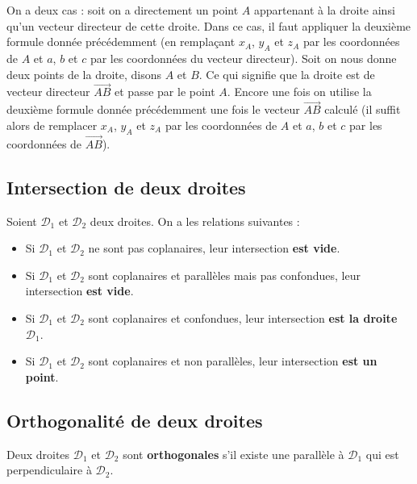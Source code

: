 	\begin{tip}
		On a deux cas : soit on a directement un point $A$ appartenant à la droite ainsi qu'un vecteur directeur de cette droite. Dans ce cas, il faut appliquer la deuxième formule donnée précédemment (en remplaçant $x_A$, $y_A$ et $z_A$ par les coordonnées de $A$ et $a$, $b$ et $c$ par les coordonnées du vecteur directeur).
		\newpar
		Soit on nous donne deux points de la droite, disons $A$ et $B$. Ce qui signifie que la droite est de vecteur directeur $\overrightarrow{AB}$ et passe par le point $A$. Encore une fois on utilise la deuxième formule donnée précédemment une fois le vecteur $\overrightarrow{AB}$ calculé (il suffit alors de remplacer $x_A$, $y_A$ et $z_A$ par les coordonnées de $A$ et $a$, $b$ et $c$ par les coordonnées de $\overrightarrow{AB}$).
	\end{tip}

	\subsection{Intersection de deux droites}

	\begin{formula}
		Soient $\mathcal{D}_1$ et $\mathcal{D}_2$ deux droites. On a les relations suivantes :
		\begin{itemize}
			\item Si $\mathcal{D}_1$ et $\mathcal{D}_2$ ne sont pas coplanaires, leur intersection \textbf{est vide}.
			\item Si $\mathcal{D}_1$ et $\mathcal{D}_2$ sont coplanaires et parallèles mais pas confondues, leur intersection \textbf{est vide}.
			\item Si $\mathcal{D}_1$ et $\mathcal{D}_2$ sont coplanaires et confondues, leur intersection \textbf{est la droite $\mathcal{D}_1$}.
			\item Si $\mathcal{D}_1$ et $\mathcal{D}_2$ sont coplanaires et non parallèles, leur intersection \textbf{est un point}.
		\end{itemize}
	\end{formula}

	\subsection{Orthogonalité de deux droites}

	\begin{formula}[Définition]
		Deux droites $\mathcal{D}_1$ et $\mathcal{D}_2$ sont \textbf{orthogonales} s'il existe une parallèle à $\mathcal{D}_1$ qui est perpendiculaire à $\mathcal{D}_2$.
	\end{formula}


